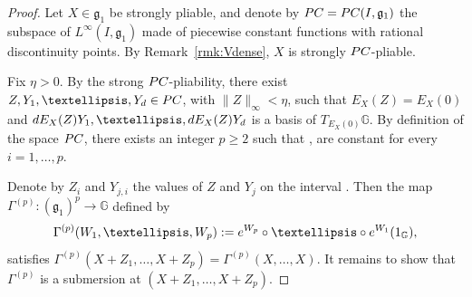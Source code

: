 \documentclass[10pt,a4paper]{amsart}
\begin{document}
\begin{proof}
Let $X\in{\mathfrak g}_1$ be strongly pliable, and denote by ${\rm PC}={\rm PC}(I,{\mathfrak g}_1)$ the subspace of $L^\infty(I,{\mathfrak g}_1)$ made of piecewise constant functions with rational discontinuity points. By Remark~\ref{rmk:Vdense}, $X$ is strongly ${\rm PC}$-pliable.


 Fix $\eta>0$. By the strong ${\rm PC}$-pliability, there exist $Z,Y_1,\dots,Y_d\in {\rm PC}$, with $\|Z\|_\infty<\eta$, such that $E_X(Z) = E_X(0)$ and ${\rm d}E_X(Z)Y_1,\dots,{\rm d}E_X(Z)Y_d$ is a basis of $T_{E_X(0)}\mathbb{G}$. By definition of the space ${\rm PC}$, there exists an integer $p\ge 2$ such that ,  are constant for every $i=1,\dots,p$.

 Denote by $Z_i$ and $Y_{j,i}$ the values of $Z$ and $Y_j$ on the interval . Then the map $\Gamma^{(p)}\colon ({\mathfrak g}_1)^p\to\mathbb{G}$ defined by
 \[
 \Gamma^{(p)}(W_1,\dots,W_p):= {\rm e}^{{W_{p}}}\circ \dots \circ {\rm e}^{{W_{1}}}(1_\mathbb{G}),
 \]
satisfies $\Gamma^{(p)} (X+Z_1,\dots,X+Z_p) = \Gamma^{(p)} (X, \dots, X)$.
 It remains to show
that $\Gamma^{(p)}$ is a submersion at $(X+Z_1,\dots,X+Z_p)$.


\end{proof}
\end{document}

